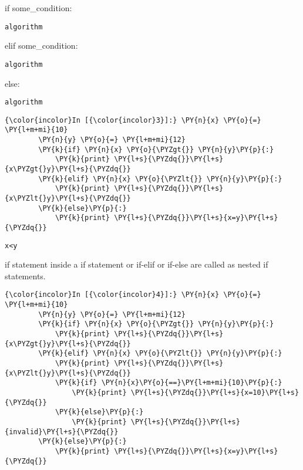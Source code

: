    if some\_condition:

\begin{verbatim}
algorithm
\end{verbatim}

elif some\_condition:

\begin{verbatim}
algorithm
\end{verbatim}

else:

\begin{verbatim}
algorithm
\end{verbatim}

    \begin{Verbatim}[commandchars=\\\{\}]
{\color{incolor}In [{\color{incolor}3}]:} \PY{n}{x} \PY{o}{=} \PY{l+m+mi}{10}
        \PY{n}{y} \PY{o}{=} \PY{l+m+mi}{12}
        \PY{k}{if} \PY{n}{x} \PY{o}{\PYZgt{}} \PY{n}{y}\PY{p}{:}
            \PY{k}{print} \PY{l+s}{\PYZdq{}}\PY{l+s}{x\PYZgt{}y}\PY{l+s}{\PYZdq{}}
        \PY{k}{elif} \PY{n}{x} \PY{o}{\PYZlt{}} \PY{n}{y}\PY{p}{:}
            \PY{k}{print} \PY{l+s}{\PYZdq{}}\PY{l+s}{x\PYZlt{}y}\PY{l+s}{\PYZdq{}}
        \PY{k}{else}\PY{p}{:}
            \PY{k}{print} \PY{l+s}{\PYZdq{}}\PY{l+s}{x=y}\PY{l+s}{\PYZdq{}}
\end{Verbatim}

    \begin{Verbatim}[commandchars=\\\{\}]
x<y
    \end{Verbatim}

    if statement inside a if statement or if-elif or if-else are called as
nested if statements.

    \begin{Verbatim}[commandchars=\\\{\}]
{\color{incolor}In [{\color{incolor}4}]:} \PY{n}{x} \PY{o}{=} \PY{l+m+mi}{10}
        \PY{n}{y} \PY{o}{=} \PY{l+m+mi}{12}
        \PY{k}{if} \PY{n}{x} \PY{o}{\PYZgt{}} \PY{n}{y}\PY{p}{:}
            \PY{k}{print} \PY{l+s}{\PYZdq{}}\PY{l+s}{x\PYZgt{}y}\PY{l+s}{\PYZdq{}}
        \PY{k}{elif} \PY{n}{x} \PY{o}{\PYZlt{}} \PY{n}{y}\PY{p}{:}
            \PY{k}{print} \PY{l+s}{\PYZdq{}}\PY{l+s}{x\PYZlt{}y}\PY{l+s}{\PYZdq{}}
            \PY{k}{if} \PY{n}{x}\PY{o}{==}\PY{l+m+mi}{10}\PY{p}{:}
                \PY{k}{print} \PY{l+s}{\PYZdq{}}\PY{l+s}{x=10}\PY{l+s}{\PYZdq{}}
            \PY{k}{else}\PY{p}{:}
                \PY{k}{print} \PY{l+s}{\PYZdq{}}\PY{l+s}{invalid}\PY{l+s}{\PYZdq{}}
        \PY{k}{else}\PY{p}{:}
            \PY{k}{print} \PY{l+s}{\PYZdq{}}\PY{l+s}{x=y}\PY{l+s}{\PYZdq{}}
\end{Verbatim}

